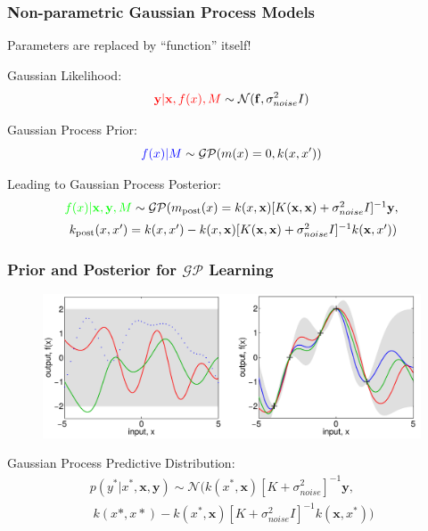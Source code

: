 \documentclass[10pt]{beamer}
\newcommand{\bx}{\mathbf{x}}
\newcommand{\by}{\mathbf{y}}
\newcommand{\boldf}{\mathbf{f}}
\newcommand{\gp}{\mathcal{GP}}
\newcommand{\gaussN}{\mathcal{N}}
\begin{document}
  \begin{frame}
    \frametitle{Non-parametric Gaussian Process Models}
    Parameters are replaced by ``function'' itself!

    \pause

    Gaussian Likelihood:
      \begin{equation*}
        \textcolor{red}{\by|\bx,f(x),M} \sim \gaussN(\boldf, \sigma^2_{noise}I)
      \end{equation*}

    \pause

    Gaussian Process Prior:
      \begin{equation*}
        \textcolor{blue}{f(x)|M} \sim \gp(m(x) = 0, k(x,x'))
      \end{equation*}

    \pause

    Leading to Gaussian Process Posterior:
      \begin{equation*}
        \begin{array}{c}
          \textcolor{green}{f(x)|\bx,\by,M} \sim \gp ( m_{\text{post}}(x) = k(x,\bx)[K(\bx,\bx) + \sigma^2_{noise}I]^{-1} \by, \\[0.2cm]
          \; k_{\text{post}}(x,x') =  k(x,x') - k(x,\bx)[K(\bx,\bx) + \sigma^2_{noise}I]^{-1} k(\bx,x') )
        \end{array}
      \end{equation*}
    \end{frame}

  \begin{frame}
    \frametitle{Prior and Posterior for $\gp$ Learning}

    \begin{figure}
      \centering
      \includegraphics[width=\textwidth]{gpRegression.png}
    \end{figure}

    Gaussian Process Predictive Distribution:
      \begin{equation*}
        \begin{array}{c}
          p(y^*|x^*,\bx,\by) \sim \gaussN ( k(x^*,\bx)[K + \sigma^2_{noise}]^{-1}\by, \\[0.2cm]
          \; k(x*,x*) - k(x^*,\bx)[K + \sigma^2_{noise}I]^{-1} k(\bx,x^*) )
        \end{array}
      \end{equation*}

  \end{frame}
\end{document}
